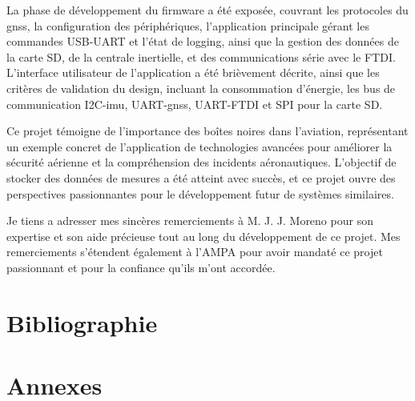 \documentclass[12pt,a4paper,twoside]{article}
\begin{document}
La phase de développement du firmware a été exposée, couvrant les protocoles du \gls{gnss}, la configuration des périphériques, l'application principale gérant les commandes USB-UART et l'état de logging, ainsi que la gestion des données de la carte SD, de la centrale inertielle, et des communications série avec le \gls{FTDI}. L'interface utilisateur de l'application a été brièvement décrite, ainsi que les critères de validation du design, incluant la consommation d'énergie, les bus de communication I2C-\gls{imu}, UART-\gls{gnss}, UART-\gls{FTDI} et SPI pour la carte SD.

Ce projet témoigne de l'importance des boîtes noires dans l'aviation,  représentant un exemple concret de l'application de technologies avancées pour améliorer la sécurité aérienne et la compréhension des incidents aéronautiques. L'objectif de stocker des données de mesures a été atteint avec succès, et ce projet ouvre des perspectives passionnantes pour le développement futur de systèmes similaires.

Je tiens a adresser mes sincères remerciements à M. J. J. Moreno pour son expertise et son aide précieuse tout au long du développement de ce projet. Mes remerciements s'étendent également à l'AMPA pour avoir mandaté ce projet passionnant et pour la confiance qu'ils m'ont accordée.


\newpage
\nocite{*}
\section{Bibliographie}
 



\clearpage
\section{Annexes}






\end{document}
